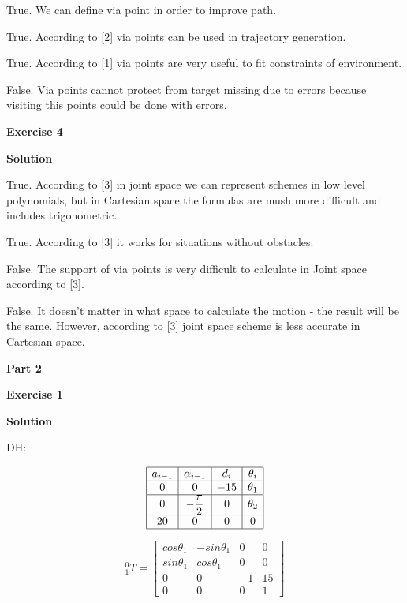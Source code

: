 \documentclass[12pt]{article}
\begin{document}
\begin{list}{()~}{}
\item True. We can define via point in order to improve path. 
\item True. According to [2] via points can be used in trajectory generation.
\item True. According to [1] via points are very useful to fit constraints of environment.
\item False. Via points cannot protect from target missing due to errors because visiting this points could be done with errors.
\end{list}

\textbf{Exercise 4}		
		
\textbf{Solution}

\medskip

\begin{list}{()~}{}
\item True. According to [3] in joint space we can represent schemes in low level polynomials, but in Cartesian space the formulas are mush more difficult and includes trigonometric.
\item True. According to [3] it works for situations without obstacles.
\item False. The support of via points is very difficult to calculate in Joint space according to [3].
\item False. It doesn't matter in what space to calculate the motion - the result will be the same. However, according to [3] joint space scheme is less accurate in Cartesian space.
\end{list}

\textbf{Part 2}	

\bigskip
	
\textbf{Exercise 1}		
		
\textbf{Solution}

DH:

\[
\begin{array}{|c|c|c|c|}
\hline
a_{i-1} & \alpha_{i-1} & d_i & \theta_i\\
\hline
0 & 0 & -15 & \theta_1 \\
\hline
0 & -\dfrac{\pi}{2} & 0 & \theta_2\\
\hline
20 & 0 & 0 & 0\\
\hline
\end{array}
\]

\[^0_{1}T=\left[
\begin{array}{cccc}
cos\theta_1 & -sin\theta_1 & 0 & 0 \\
sin\theta_1 & cos\theta_1 & 0 & 0 \\
0 & 0 & -1 & 15\\
0 & 0 & 0 & 1
\end{array} \right]\]
\end{document}
